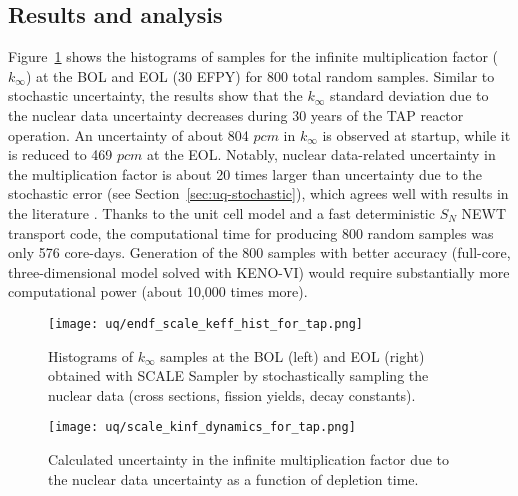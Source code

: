 \subsection{Results and analysis}
Figure~\ref{fig:uq-scale-kinf-hist} shows the histograms of samples for the 
infinite multiplication factor ($k_{\infty}$) at the \gls{BOL} and \gls{EOL} 
(30 \gls{EFPY}) for 800 total random samples. Similar to stochastic 
uncertainty, the results show that the $k_{\infty}$ standard deviation due to 
the nuclear data uncertainty decreases during 30 years of the \gls{TAP} 
reactor operation. An uncertainty of about 804 $pcm$ in $k_{\infty}$ is 
observed at startup, while it is reduced to 469 $pcm$ at the \gls{EOL}. 
Notably, nuclear data-related uncertainty in the multiplication factor is 
about 20 times larger than uncertainty due to the stochastic error (see 
Section~\ref{sec:uq-stochastic}), which agrees well with results in the 
literature \cite{takeda_estimation_1999, garcia-herranz_propagation_2008}. 
Thanks to the unit cell model and a fast deterministic $S_N$ NEWT transport 
code, the computational time for producing 800 random samples was only 576 
core-days. Generation of the 800 samples with better accuracy (full-core, 
three-dimensional model solved with KENO-VI) would require substantially more 
computational power (about 10,000 times more).
\begin{figure}[htp!] %
	\centering
	\texttt{[image: uq/endf\_scale\_keff\_hist\_for\_tap.png]}
		\vspace{-8mm}
	\caption{Histograms of $k_{\infty}$ samples at the \gls{BOL} (left) and 
		\gls{EOL} (right) obtained with SCALE Sampler by stochastically 
		sampling the nuclear data (cross sections, fission yields, decay 
		constants).}
	\label{fig:uq-scale-kinf-hist}
\end{figure}
\begin{figure}[hbp!] %
	\centering
	\texttt{[image: uq/scale\_kinf\_dynamics\_for\_tap.png]}
	\caption{Calculated uncertainty in the infinite multiplication factor due 
		to the nuclear data uncertainty as a function of depletion time.}
	\label{fig:uq-scale-kinf}
\end{figure}

